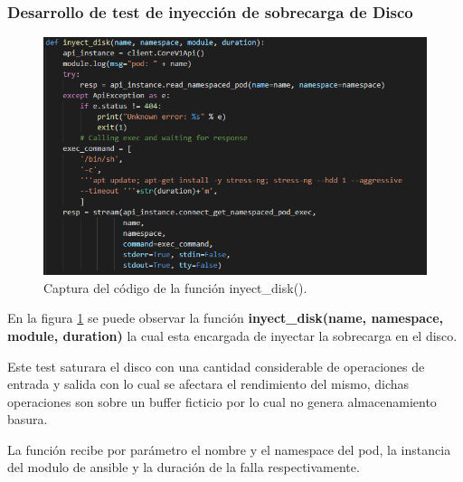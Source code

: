 \subsubsection{Desarrollo de test de inyección de sobrecarga de Disco}

\begin{figure}[htpb!]
	\centering
	\includegraphics[width=0.95\columnwidth]{images/captures/codigo/Capture_inyect_disk.PNG}
	\caption{Captura del código de la función inyect\_disk().}
	\label{fig:codi05}
\end{figure}

\par En la figura \ref{fig:codi05} se puede observar la función \textbf{ inyect\_disk(name, namespace, module, duration)} la cual esta encargada de inyectar la sobrecarga en el disco.\\

\par Este test saturara el disco con una cantidad considerable de operaciones de entrada y salida con lo cual se afectara el rendimiento del mismo, dichas operaciones son sobre un buffer ficticio por lo cual no genera almacenamiento basura. \\

\par La función recibe por parámetro el nombre y el namespace del pod, la instancia del modulo de ansible y la duración de la falla respectivamente. \\


